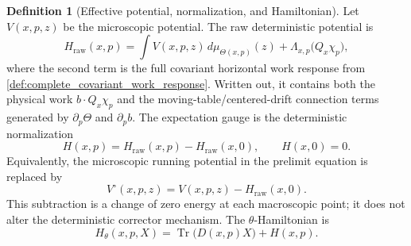 \documentclass[12pt, letterpaper]{amsart}
\providecommand{\Tr}{\operatorname{Tr}}
\theoremstyle{plain}
\theoremstyle{definition}
\newtheorem{definition}[theorem]{Definition}
\theoremstyle{remark}
\begin{document}
\begin{definition}[Effective potential, normalization, and Hamiltonian]
\label{def:effective_hamiltonian_normalized}
Let $V(x,p,z)$ be the microscopic potential.  The raw deterministic potential is
\begin{equation}
\label{eq:H_raw_complete_covariant}
    H_{\mathrm{raw}}(x,p)
    =\int V(x,p,z)\,d\mu_{\Theta(x,p)}(z)
     +\Lambda_{x,p}\bigl(Q_x\chi_p\bigr),
\end{equation}
where the second term is the full covariant horizontal work response from
\cref{def:complete_covariant_work_response}.  Written out, it contains both the
physical work $b\cdot Q_x\chi_p$ and the moving-table/centered-drift connection
terms generated by $\partial_p\Theta$ and $\partial_p b$.  The expectation gauge
is the deterministic normalization
\begin{equation}
    H(x,p)=H_{\mathrm{raw}}(x,p)-H_{\mathrm{raw}}(x,0),
    \qquad H(x,0)=0 .
\end{equation}
Equivalently, the microscopic running potential in the prelimit equation is
replaced by
\begin{equation}
    V^\circ(x,p,z)=V(x,p,z)-H_{\mathrm{raw}}(x,0).
\end{equation}
This subtraction is a change of zero energy at each macroscopic point; it does
not alter the deterministic corrector mechanism.  The $\theta$-Hamiltonian is
\begin{equation}
    H_\theta(x,p,X)=\Tr\big(D(x,p)X\big)+H(x,p).
\end{equation}
\end{definition}
\end{document}
